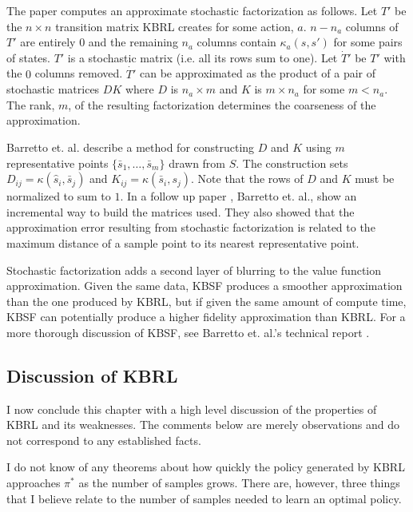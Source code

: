 The paper computes an approximate stochastic factorization as follows.
Let $T'$ be the $n \times n$ transition matrix KBRL creates for some action,
$a$.
$n - n_a$ columns of $T'$ are entirely $0$ and the remaining
$n_a$ columns contain $\kappa_a(s,s')$ for some pairs of states.
$T'$ is a stochastic matrix (i.e. all its rows sum to one).
Let $\dot{T}'$ be $T'$ with the $0$ columns removed.
$\dot{T'}$ can be approximated as the product of a pair of stochastic matrices $DK$
where $D$ is $n_a \times m$ and $K$ is $m \times n_a$ for some $m < n_a$.
The rank, $m$, of the resulting factorization determines the coarseness of
the approximation.

Barretto et. al. \cite{kbsf} describe a method for constructing $D$ and $K$ using
$m$ representative points $\{\bar s_1, \ldots, \bar s_m\}$ drawn from $S$.
The construction sets $D_{ij} = \kappa(\hat s_i, \bar s_j)$ and
$K_{ij} = \kappa(\bar s_i, s_j)$.
Note that the rows of $D$ and $K$ must be normalized to sum to $1$.
In a follow up paper \cite{ikbsf}, Barretto et. al., show an incremental way
to build the matrices used. They also showed that the approximation
error resulting from stochastic factorization is related to the maximum
distance of a sample point to its nearest representative point.

Stochastic factorization adds a second layer of blurring to the value function
approximation. 
Given the same data, KBSF produces a smoother approximation than the one
produced by KBRL, but if given the same amount of compute time,
KBSF can potentially produce a higher fidelity approximation than KBRL.
For a more thorough discussion of KBSF, see Barretto et. al.'s technical report
\cite{pkbrl}.

\subsection{Discussion of KBRL}
I now conclude this chapter with a high level discussion of the
properties of KBRL and its weaknesses.
The comments below are merely observations and do not correspond to any 
established facts.

I do not know of any theorems about how quickly the policy generated by
KBRL approaches $\pi^*$ as the number of samples grows. 
There are, however, three things that I believe relate to the number of
samples needed to learn an optimal policy.

